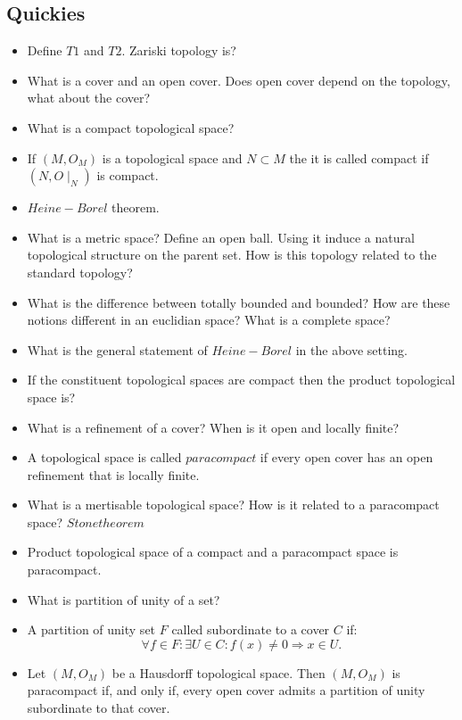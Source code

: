 \subsection{Quickies}

\begin{itemize}
\item
Define $T1$ and $T2$. Zariski topology is?
\item
What is a cover and an open cover. Does open cover depend on the topology, what about the cover?
\item
What is a compact topological space?
\item
If $(M,O_{M})$ is a topological space and $N \subset M$ the it is called compact if $(N,O\mid_{N})$ is compact.
\item
$Heine-Borel$  theorem.
\item
What is a metric space? Define an open ball. Using it induce a natural topological structure on the parent set. How is this topology related to the standard topology?
\item
What is the difference between totally bounded and bounded? How are these notions different in an euclidian space? What is a complete space?
\item
What is the general statement of $Heine-Borel$ in the above setting.
\item
If the constituent topological spaces are compact then the product topological space is?
\item
What is a refinement of a cover? When is it open and locally finite?
\item
A topological space is called $paracompact$ if every open cover has an open refinement that is locally finite.
\item
What is a mertisable topological space? How is it related to a paracompact space? $Stone theorem$
\item
Product topological space of a compact and a paracompact space is paracompact.
\item
What is partition of unity of a set? 
\item
A partition of unity set $F$ called subordinate to a cover $C$ if: 
\[\forall f \in F:\exists U \in C: f(x) \neq 0 \Rightarrow x \in U.\]

\item
Let $(M,O_{M})$ be a Hausdorff topological space. Then $(M,O_{M})$ is paracompact if, and only if, every open cover admits a partition of unity subordinate to that cover.


\end{itemize}

